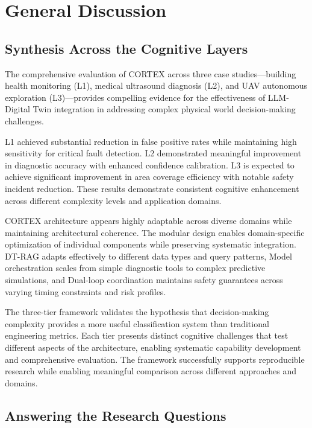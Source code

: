 
\chapter{General Discussion} \label{chp:discussion}

\section{Synthesis Across the Cognitive Layers}

The comprehensive evaluation of CORTEX across three case studies—building health monitoring (L1), medical ultrasound diagnosis (L2), and UAV autonomous exploration (L3)—provides compelling evidence for the effectiveness of LLM-Digital Twin integration in addressing complex physical world decision-making challenges.

L1 achieved substantial reduction in false positive rates while maintaining high sensitivity for critical fault detection. L2 demonstrated meaningful improvement in diagnostic accuracy with enhanced confidence calibration. L3 is expected to achieve significant improvement in area coverage efficiency with notable safety incident reduction. These results demonstrate consistent cognitive enhancement across different complexity levels and application domains.

CORTEX architecture appears highly adaptable across diverse domains while maintaining architectural coherence. The modular design enables domain-specific optimization of individual components while preserving systematic integration. DT-RAG adapts effectively to different data types and query patterns, Model orchestration scales from simple diagnostic tools to complex predictive simulations, and Dual-loop coordination maintains safety guarantees across varying timing constraints and risk profiles.

The three-tier framework validates the hypothesis that decision-making complexity provides a more useful classification system than traditional engineering metrics. Each tier presents distinct cognitive challenges that test different aspects of the architecture, enabling systematic capability development and comprehensive evaluation. The framework successfully supports reproducible research while enabling meaningful comparison across different approaches and domains.

\section{Answering the Research Questions}

